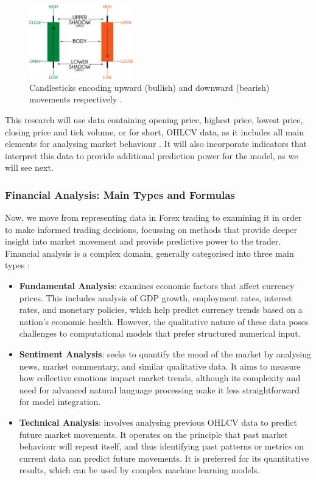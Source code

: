 \begin{figure}[htb!]
\centering
\includegraphics[width=0.4\textwidth]{Images/CandlestickChart.png}
\caption{Candlesticks encoding upward (bullish) and downward (bearish) movements respectively \cite{teo_candlestick_nodate}.}
\label{Figure:CandlestickChart}
\end{figure}

This research will use data containing opening price, highest price, lowest price, closing price and tick volume, or for short, OHLCV data, as it includes all main elements for analysing market behaviour \cite{rhoads_candlestick_2022}. It will also incorporate indicators that interpret this data to provide additional prediction power for the model, as we will see next.

\subsubsection{Financial Analysis: Main Types and Formulas}

Now, we move from representing data in Forex trading to examining it in order to make informed trading decisions, focussing on methods that provide deeper insight into market movement and provide predictive power to the trader. Financial analysis is a complex domain, generally categorised into three main types \cite{lim_handbook_2015}: 

\begin{itemize}
\item \textbf{Fundamental Analysis}: examines economic factors that affect currency prices. This includes analysis of GDP growth, employment rates, interest rates, and monetary policies, which help predict currency trends based on a nation's economic health. However, the qualitative nature of these data poses challenges to computational models that prefer structured numerical input.
\item \textbf{Sentiment Analysis}: seeks to quantify the mood of the market by analysing news, market commentary, and similar qualitative data. It aims to measure how collective emotions impact market trends, although its complexity and need for advanced natural language processing make it less straightforward for model integration.
\item \textbf{Technical Analysis}: involves analysing previous OHLCV data to predict future market movements. It operates on the principle that past market behaviour will repeat itself, and thus identifying past patterns or metrics on current data can predict future movements. It is preferred for its quantitative results, which can be used by complex machine learning models.
\end{itemize}

